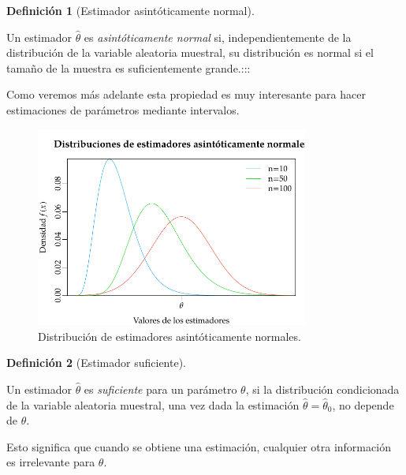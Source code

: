 \documentclass[
  a4paper,
]{scrreport}
\theoremstyle{plain}
\theoremstyle{definition}
\theoremstyle{definition}
\newtheorem{definition}{Definición}[chapter]
\theoremstyle{remark}
\begin{document}
\begin{definition}[Estimador asintóticamente
normal]\protect\hypertarget{def-estimador-asintóticamente-normal}{}\label{def-estimador-asintóticamente-normal}

Un estimador \(\hat \theta\) es \emph{asintóticamente normal} si,
independientemente de la distribución de la variable aleatoria muestral,
su distribución es normal si el tamaño de la muestra es suficientemente
grande.:::

\end{definition}

Como veremos más adelante esta propiedad es muy interesante para hacer
estimaciones de parámetros mediante intervalos.

\begin{figure}[H]

{\centering \includegraphics[width=0.8\textwidth,height=\textheight]{img/estimacion/estimador-asintoticamente-normal.pdf}

}

\caption{Distribución de estimadores asintóticamente normales.}

\end{figure}%

\begin{definition}[Estimador
suficiente]\protect\hypertarget{def-estimador-suficiente}{}\label{def-estimador-suficiente}

Un estimador \(\hat \theta\) es \emph{suficiente} para un parámetro
\(\theta\), si la distribución condicionada de la variable aleatoria
muestral, una vez dada la estimación \(\hat \theta = \hat \theta_0\), no
depende de \(\theta\).

\end{definition}

Esto significa que cuando se obtiene una estimación, cualquier otra
información es irrelevante para \(\theta\).
\end{document}
